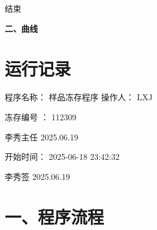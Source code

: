 \documentclass[UTF8,10pt,a4paper,fontset=fandol]{ctexart}
\newcommand{\fieldvalue}[1]{#1}
\newcommand{\handwritten}[1]{#1}
\begin{document}
\noindent 结束

\medskip

\noindent\textbf{二、曲线}

\begin{center}
\end{center}

\newpage

\section*{运行记录}

\noindent
程序名称：
\fieldvalue{样品冻存程序}
\qquad
操作人：
\fieldvalue{LXJ}

\vspace{0.5em}

\handwritten{冻存编号}
：
\handwritten{112309}

\handwritten{李秀主任}
\qquad
\handwritten{2025.06.19}

\vspace{0.5em}

开始时间：
\fieldvalue{2025-06-18 23:42:32}

\vspace{0.25em}

\handwritten{李秀签}
\qquad
\handwritten{2025.06.19}

\section*{一、程序流程}
\end{document}
